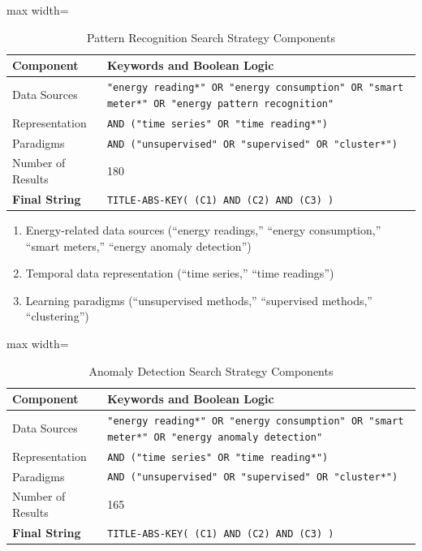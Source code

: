 ﻿\documentclass[12pt,reqno, twoside]{amsbook}
\numberwithin{figure}{chapter}
\numberwithin{table}{chapter}
\numberwithin{equation}{chapter}
\theoremstyle{plain}
\numberwithin{equation}{chapter}
\numberwithin{section}{chapter}
\begin{document}
\begin{table}[ht]
\centering
\caption{Pattern Recognition Search Strategy Components}
\label{tab:pattern_recognition_search_strategy}
\begin{adjustbox}{max width=\textwidth}
\begin{tabular}{lp{10cm}}
\hline
\textbf{Component} & \textbf{Keywords and Boolean Logic} \\ \hline
Data Sources & \texttt{"energy reading*" OR "energy consumption" OR "smart meter*" OR "energy pattern recognition"} \\
Representation & \texttt{AND ("time series" OR "time reading*")} \\
Paradigms & \texttt{AND ("unsupervised" OR "supervised" OR "cluster*")} \\
Number of Results & 180 \\ \hline
\textbf{Final String} & \texttt{TITLE-ABS-KEY( (C1) AND (C2) AND (C3) )} \\ \hline
\end{tabular}
\end{adjustbox}
\end{table}

\begin{enumerate}[label=(\roman*)]
    \item Energy-related data sources (``energy readings,'' ``energy consumption,'' ``smart meters,'' ``energy anomaly detection'')
    \item Temporal data representation (``time series,'' ``time readings'')
    \item Learning paradigms (``unsupervised methods,'' ``supervised methods,'' ``clustering'')
\end{enumerate}
\begin{table}[ht]
\centering
\caption{Anomaly Detection Search Strategy Components}
\label{tab:search_strategy}
\begin{adjustbox}{max width=\textwidth}
\begin{tabular}{lp{10cm}}
\hline
\textbf{Component} & \textbf{Keywords and Boolean Logic} \\ \hline
Data Sources & \texttt{"energy reading*" OR "energy consumption" OR "smart meter*" OR "energy anomaly detection"} \\
Representation & \texttt{AND ("time series" OR "time reading*")} \\
Paradigms & \texttt{AND ("unsupervised" OR "supervised" OR "cluster*")} \\
Number of Results & 165 \\ \hline
\textbf{Final String} & \texttt{TITLE-ABS-KEY( (C1) AND (C2) AND (C3) )} \\ \hline
\end{tabular}
\end{adjustbox}
\end{table}
\end{document}

